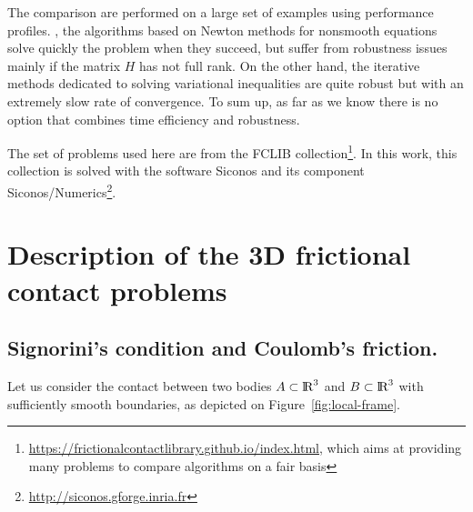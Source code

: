 The comparison are performed on a large set of examples using performance profiles.
, the algorithms based on Newton methods for nonsmooth equations solve quickly the problem when they succeed, but suffer from robustness issues mainly if the matrix $H$ has not full rank. On the other hand, the
iterative methods dedicated to solving variational inequalities are quite robust but with an extremely slow rate of convergence. To sum up, as far as we know there is no option that combines time efficiency and robustness.
{The set of problems used here are from the FCLIB collection\footnote{\url{https://frictionalcontactlibrary.github.io/index.html}, which aims at providing many problems to compare algorithms on a fair basis}.  In this work, this collection is solved with the software {\sc Siconos} and its component {\sc Siconos/Numerics}\footnote{\url{http://siconos.gforge.inria.fr}}\citep{Acary.Bremond.Huber.Perignon2015}.

\section{Description of the 3D frictional contact problems}
\label{sec:description}
\subsection{Signorini's condition and Coulomb's friction.}

Let us consider the contact between two  bodies $A \subset  \mbox{l\hspace{ -.15em}R}^3$ and $B \subset \mbox{l\hspace{ -.15em}R}^3$ with sufficiently smooth boundaries, as depicted on Figure~\ref{fig:local-frame}.
\begin{figure}[htb]
  \centering
\end{figure}}
